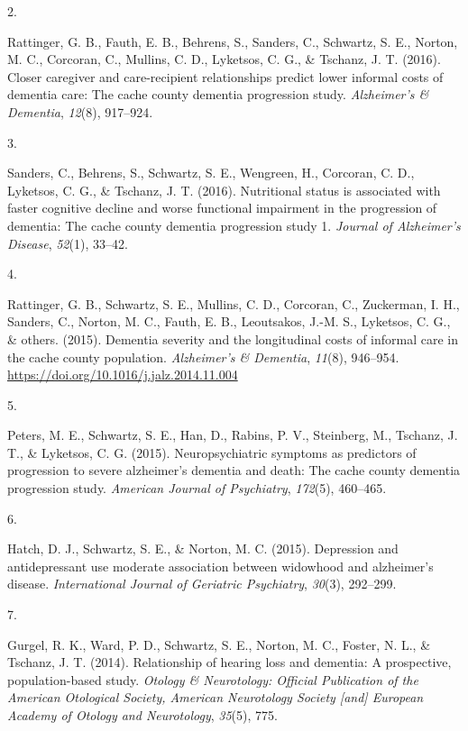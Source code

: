 \documentclass[11pt,a4paper,]{moderncv}
\newlength{\csllabelwidth}
\newcommand{\CSLLeftMargin}[1]{\parbox[t]{\csllabelwidth}{#1}}
\newcommand{\CSLRightInline}[1]{\parbox[t]{\linewidth - \csllabelwidth}{#1}}
\begin{document}
\leavevmode\hypertarget{ref-rattinger2016}{}%
\CSLLeftMargin{2. }
\CSLRightInline{Rattinger, G. B., Fauth, E. B., Behrens, S., Sanders,
C., Schwartz, S. E., Norton, M. C., Corcoran, C., Mullins, C. D.,
Lyketsos, C. G., \& Tschanz, J. T. (2016). Closer caregiver and
care-recipient relationships predict lower informal costs of dementia
care: The cache county dementia progression study. \emph{Alzheimer's \&
Dementia}, \emph{12}(8), 917--924.}

\leavevmode\hypertarget{ref-sanders2016}{}%
\CSLLeftMargin{3. }
\CSLRightInline{Sanders, C., Behrens, S., Schwartz, S. E., Wengreen, H.,
Corcoran, C. D., Lyketsos, C. G., \& Tschanz, J. T. (2016). Nutritional
status is associated with faster cognitive decline and worse functional
impairment in the progression of dementia: The cache county dementia
progression study 1. \emph{Journal of Alzheimer's Disease},
\emph{52}(1), 33--42.}

\leavevmode\hypertarget{ref-rattinger2015}{}%
\CSLLeftMargin{4. }
\CSLRightInline{Rattinger, G. B., Schwartz, S. E., Mullins, C. D.,
Corcoran, C., Zuckerman, I. H., Sanders, C., Norton, M. C., Fauth, E.
B., Leoutsakos, J.-M. S., Lyketsos, C. G., \& others. (2015). Dementia
severity and the longitudinal costs of informal care in the cache county
population. \emph{Alzheimer's \& Dementia}, \emph{11}(8), 946--954.
\url{https://doi.org/10.1016/j.jalz.2014.11.004}}

\leavevmode\hypertarget{ref-peters2015}{}%
\CSLLeftMargin{5. }
\CSLRightInline{Peters, M. E., Schwartz, S. E., Han, D., Rabins, P. V.,
Steinberg, M., Tschanz, J. T., \& Lyketsos, C. G. (2015).
Neuropsychiatric symptoms as predictors of progression to severe
alzheimer's dementia and death: The cache county dementia progression
study. \emph{American Journal of Psychiatry}, \emph{172}(5), 460--465.}

\leavevmode\hypertarget{ref-hatch2015}{}%
\CSLLeftMargin{6. }
\CSLRightInline{Hatch, D. J., Schwartz, S. E., \& Norton, M. C. (2015).
Depression and antidepressant use moderate association between widowhood
and alzheimer's disease. \emph{International Journal of Geriatric
Psychiatry}, \emph{30}(3), 292--299.}

\leavevmode\hypertarget{ref-gurgel2014}{}%
\CSLLeftMargin{7. }
\CSLRightInline{Gurgel, R. K., Ward, P. D., Schwartz, S. E., Norton, M.
C., Foster, N. L., \& Tschanz, J. T. (2014). Relationship of hearing
loss and dementia: A prospective, population-based study. \emph{Otology
\& Neurotology: Official Publication of the American Otological Society,
American Neurotology Society {[}and{]} European Academy of Otology and
Neurotology}, \emph{35}(5), 775.}
\end{document}
